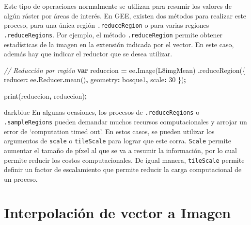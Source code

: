 \documentclass[
  12pt,
  letterpaper,
  twoside]{book}
\newenvironment{Shaded}{\begin{snugshade}}{\end{snugshade}}
\newcommand{\AttributeTok}[1]{\textcolor[rgb]{0.77,0.63,0.00}{#1}}
\newcommand{\CommentTok}[1]{\textcolor[rgb]{0.56,0.35,0.01}{\textit{#1}}}
\newcommand{\DataTypeTok}[1]{\textcolor[rgb]{0.13,0.29,0.53}{#1}}
\newcommand{\DecValTok}[1]{\textcolor[rgb]{0.00,0.00,0.81}{#1}}
\newcommand{\FunctionTok}[1]{\textcolor[rgb]{0.00,0.00,0.00}{#1}}
\newcommand{\KeywordTok}[1]{\textcolor[rgb]{0.13,0.29,0.53}{\textbf{#1}}}
\newcommand{\NormalTok}[1]{#1}
\newcommand{\OperatorTok}[1]{\textcolor[rgb]{0.81,0.36,0.00}{\textbf{#1}}}
\newcommand{\StringTok}[1]{\textcolor[rgb]{0.31,0.60,0.02}{#1}}
\begin{document}
Este tipo de operaciones normalmente se utilizan para resumir los valores de algún ráster por áreas de interés. En GEE, existen dos métodos para realizar este proceso, para una única región \texttt{.reduceRegion} o para varias regiones \texttt{.reduceRegions}. Por ejemplo, el método \texttt{.reduceRegion} permite obtener estadísticas de la imagen en la extensión indicada por el vector. En este caso, además hay que indicar el reductor que se desea utilizar.

\begin{Shaded}
\begin{Highlighting}[]
\CommentTok{// Reducción por región}
\KeywordTok{var}\NormalTok{ reduccion }\OperatorTok{=}\NormalTok{ ee}\OperatorTok{.}\FunctionTok{Image}\NormalTok{(L8imgMean)}
  \OperatorTok{.}\FunctionTok{reduceRegion}\NormalTok{(\{}
    \DataTypeTok{reducer}\OperatorTok{:}\NormalTok{ ee}\OperatorTok{.}\AttributeTok{Reducer}\OperatorTok{.}\FunctionTok{mean}\NormalTok{()}\OperatorTok{,}
    \DataTypeTok{geometry}\OperatorTok{:}\NormalTok{ bosque1}\OperatorTok{,}
    \DataTypeTok{scale}\OperatorTok{:} \DecValTok{30}
\NormalTok{  \})}\OperatorTok{;}
  
\FunctionTok{print}\NormalTok{(reduccion}\OperatorTok{,} \StringTok{\textquotesingle{}reduccion\textquotesingle{}}\NormalTok{)}\OperatorTok{;}
\end{Highlighting}
\end{Shaded}

\begin{bluebox2}

\begin{awesomeblock}{5pt}{\faLightbulb}{darkblue}
En algunas ocasiones, los procesos de \texttt{.reduceRegions} o \texttt{.sampleRegions} pueden demandar muchos recursos computacionales y arrojar un error de `computation timed out'. En estos casos, se pueden utilizar los argumentos de \texttt{scale} o \texttt{tileScale} para lograr que este corra. \texttt{Scale} permite aumentar el tamaño de píxel al que se va a resumir la información, por lo cual permite reducir los costos computacionales. De igual manera, \texttt{tileScale} permite definir un factor de escalamiento que permite reducir la carga computacional de un proceso.

\end{awesomeblock}

\end{bluebox2}

\hypertarget{interpolaciuxf3n-de-vector-a-imagen}{%
\section{Interpolación de vector a Imagen}\label{interpolaciuxf3n-de-vector-a-imagen}}
\end{document}
